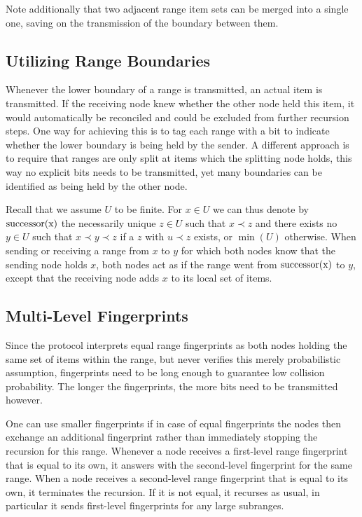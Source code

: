 Note additionally that two adjacent range item sets can be merged into a single one, saving on the transmission of the boundary between them.

\subsection{Utilizing Range Boundaries}

Whenever the lower boundary of a range is transmitted, an actual item is transmitted. If the receiving node knew whether the other node held this item, it would automatically be reconciled and could be excluded from further recursion steps. One way for achieving this is to tag each range with a bit to indicate whether the lower boundary is being held by the sender. A different approach is to require that ranges are only split at items which the splitting node holds, this way no explicit bits needs to be transmitted, yet many boundaries can be identified as being held by the other node.

Recall that we assume $U$ to be finite. For $x \in U$ we can thus denote by $\operatorname{successor({x})}$ the necessarily unique $z \in U$ such that $x \prec z$ and there exists no $y \in U$ such that $x \prec y \prec z$ if a $z$ with $u \prec z$ exists, or $\min(U)$ otherwise. When sending or receiving a range from $x$ to $y$ for which both nodes know that the sending node holds $x$, both nodes act as if the range went from $\operatorname{successor({x})}$ to $y$, except that the receiving node adds $x$ to its local set of items.

\subsection{Multi-Level Fingerprints}

Since the protocol interprets equal range fingerprints as both nodes holding the same set of items within the range, but never verifies this merely probabilistic assumption, fingerprints need to be long enough to guarantee low collision probability. The longer the fingerprints, the more bits need to be transmitted however.

One can use smaller fingerprints if in case of equal fingerprints the nodes then exchange an additional fingerprint rather than immediately stopping the recursion for this range. Whenever a node receives a first-level range fingerprint that is equal to its own, it answers with the second-level fingerprint for the same range. When a node receives a second-level range fingerprint that is equal to its own, it terminates the recursion. If it is not equal, it recurses as usual, in particular it sends first-level fingerprints for any large subranges.

